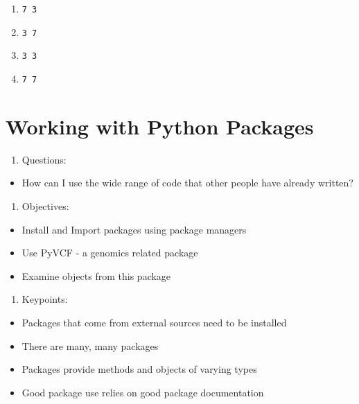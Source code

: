 \documentclass[]{book}
\providecommand{\tightlist}{%
  \setlength{\itemsep}{0pt}\setlength{\parskip}{0pt}}
\theoremstyle{definition}
\theoremstyle{definition}
\theoremstyle{definition}
\theoremstyle{remark}
\begin{document}
\begin{enumerate}
\def\labelenumi{\arabic{enumi}.}
\tightlist
\item
  \texttt{7\ 3}
\item
  \texttt{3\ 7}
\item
  \texttt{3\ 3}
\item
  \texttt{7\ 7}
\end{enumerate}

\hypertarget{working-with-python-packages}{%
\chapter{Working with Python
Packages}\label{working-with-python-packages}}

\begin{enumerate}
\def\labelenumi{\arabic{enumi}.}
\tightlist
\item
  Questions:
\end{enumerate}

\begin{itemize}
\tightlist
\item
  How can I use the wide range of code that other people have already
  written?
\end{itemize}

\begin{enumerate}
\def\labelenumi{\arabic{enumi}.}
\setcounter{enumi}{1}
\tightlist
\item
  Objectives:
\end{enumerate}

\begin{itemize}
\tightlist
\item
  Install and Import packages using package managers
\item
  Use PyVCF - a genomics related package
\item
  Examine objects from this package
\end{itemize}

\begin{enumerate}
\def\labelenumi{\arabic{enumi}.}
\setcounter{enumi}{2}
\tightlist
\item
  Keypoints:
\end{enumerate}

\begin{itemize}
\tightlist
\item
  Packages that come from external sources need to be installed
\item
  There are many, many packages
\item
  Packages provide methods and objects of varying types
\item
  Good package use relies on good package documentation
\end{itemize}
\end{document}

